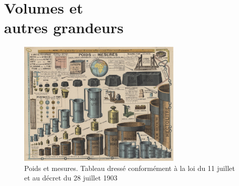\chapter{Volumes et\\autres grandeurs} \label{M14}

\bigskip

\newcommand{\Dfrac}[2]{\blue\dfrac{\textcolor{black}{#1}}{\textcolor{black}{#2}}}
\newcommand{\Imp}[2]{\left.\begin{array}{ll} #1\\[1mm] #2 \end{array}\right\}}
\newcommand{\Impl}[3]{\left.\begin{array}{lll} #1\\[1mm] #2 \\[1mm] #3 \end{array}\right\}}

\begin{figure}[h]
   \centering
      \includegraphics[height=6cm]{Grandeurs_mesures/Images/M13_M14_cours_intro_poids_et_mesures}
   \caption{Poids et mesures. Tableau dressé conformément à la loi du 11 juillet et au décret du 28 juillet 1903}
\end{figure}

